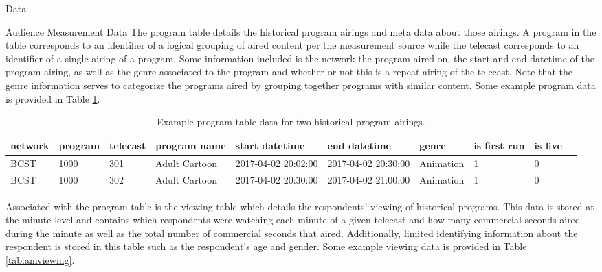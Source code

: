 \begin{chapter}{Data}
\begin{section}{Audience Measurement Data}
  The program table details the historical program airings and meta data about those airings.
  A program in the table corresponds to an identifier of a logical grouping of
  aired content per the measurement source while the telecast corresponds
  to an identifier of a single airing of a program.
  Some information included is the network the program aired on, the start and end datetime of the
  program airing, as well as the genre associated to the program and whether or not this is a repeat airing of the telecast.
  Note that the genre information serves to categorize the programs aired by grouping together
  programs with similar content.
  Some example program data is provided in Table \ref{tab:amprogram}.

  \begin{table}[h!]
    \centering
    \begin{adjustbox}{width=1.1\textwidth,center=\textwidth}
      \large
      \begin{tabular}{llllllllll}
        network & program & telecast & program name & start datetime & end datetime & genre & is first run & is live\\
        \hline
        BCST & 1000 & 301 & Adult Cartoon & 2017-04-02 20:02:00 & 2017-04-02 20:30:00 & Animation & 1 & 0 \\
        BCST & 1000 & 302 & Adult Cartoon & 2017-04-02 20:30:00 & 2017-04-02 21:00:00 & Animation & 1 & 0
      \end{tabular}
    \end{adjustbox}
    \caption{Example program table data for two historical program airings.}\label{tab:amprogram}
  \end{table}

  Associated with the program table is the viewing table which details the respondents' viewing of
  historical programs. This data is stored at the minute level and contains
  which respondents were watching each minute of a given telecast and how many commercial seconds aired
  during the minute as well as the total number of commercial seconds that aired.
  Additionally, limited identifying information about the
  respondent is stored in this table such as the respondent's age and gender.
  Some example viewing data is provided in Table \ref{tab:amviewing}.


\end{section}
\end{chapter}
